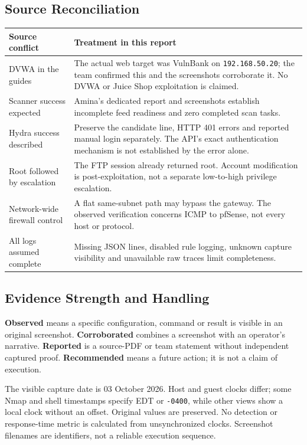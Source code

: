 \documentclass[11pt,a4paper]{article}
\begin{document}
\subsection{Source Reconciliation}
\begin{tabularx}{\linewidth}{@{}L{3.7cm}X@{}}
\toprule
\textbf{Source conflict} & \textbf{Treatment in this report}\\
\midrule
DVWA in the guides & The actual web target was VulnBank on \texttt{192.168.50.20}; the team confirmed this and the screenshots corroborate it. No DVWA or Juice Shop exploitation is claimed.\\
Scanner success expected & Amina's dedicated report and screenshots establish incomplete feed readiness and zero completed scan tasks.\\
Hydra success described & Preserve the candidate line, HTTP 401 errors and reported manual login separately. The API's exact authentication mechanism is not established by the error alone.\\
Root followed by escalation & The FTP session already returned root. Account modification is post-exploitation, not a separate low-to-high privilege escalation.\\
Network-wide firewall control & A flat same-subnet path may bypass the gateway. The observed verification concerns ICMP to pfSense, not every host or protocol.\\
All logs assumed complete & Missing JSON lines, disabled rule logging, unknown capture visibility and unavailable raw traces limit completeness.\\
\bottomrule
\end{tabularx}

\subsection{Evidence Strength and Handling}
\textbf{Observed} means a specific configuration, command or result is visible in an original screenshot. \textbf{Corroborated} combines a screenshot with an operator's narrative. \textbf{Reported} is a source-PDF or team statement without independent captured proof. \textbf{Recommended} means a future action; it is not a claim of execution.

The visible capture date is 03 October 2026. Host and guest clocks differ; some Nmap and shell timestamps specify EDT or \texttt{-0400}, while other views show a local clock without an offset. Original values are preserved. No detection or response-time metric is calculated from unsynchronized clocks. Screenshot filenames are identifiers, not a reliable execution sequence.
\end{document}
